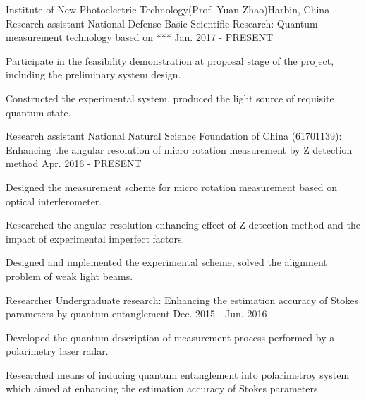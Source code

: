 \begin{cventries}
  \cventry
  {}{Institute of New Photoelectric Technology(Prof. Yuan Zhao)}{Harbin, China}{}{}
  \cvsubentry
    {Research assistant}
    {National Defense Basic Scientific Research: Quantum measurement technology based on ***}
    {Jan. 2017 - PRESENT}
    {}
    {
      \begin{cvitems}
        \item {Participate in the feasibility demonstration at proposal stage of the project, including the preliminary system design.}
        \item {Constructed the experimental system, produced the light source of requisite quantum state.}
      \end{cvitems} 
    }  
  \cvsubentry
    {Research assistant}
    {National Natural Science Foundation of China (61701139): Enhancing the angular resolution of micro rotation measurement by Z detection method}
    {Apr. 2016 - PRESENT}
    {}
    {
      \begin{cvitems}
        \item {Designed the measurement scheme for micro rotation measurement based on optical interferometer.}
        \item {Researched the angular resolution enhancing effect of Z detection method and the impact of experimental imperfect factors.}
        \item {Designed and implemented the experimental scheme, solved the alignment problem of weak light beams.}
      \end{cvitems} 
    }  
  \cvsubentry
    {Researcher}
    {Undergraduate research: Enhancing the estimation accuracy of Stokes parameters by quantum entanglement}
    {Dec. 2015 - Jun. 2016}
    {}
    {
      \begin{cvitems}
        \item {Developed the quantum description of measurement process performed by a polarimetry laser radar.}
        \item {Researched means of inducing quantum entanglement into polarimetroy system which aimed at enhancing the estimation accuracy of Stokes parameters.}
      \end{cvitems} 
    }
\end{cventries}